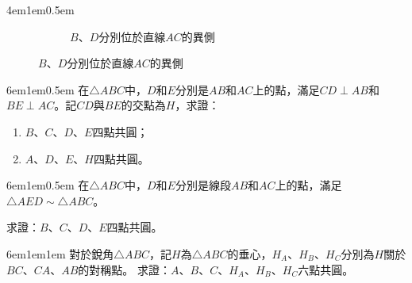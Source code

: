 \documentclass[12pt]{article}
\begin{document}
\begin{mybox}[定理]{4em}{1em}{0.5em}
\begin{figure}[H]
\begin{subfigure}[b]{0.45\textwidth}
            \centering
            \caption{$B$、$D$分別位於直線$AC$的異側}
            \label{fig:concyclic_s2.1-2}
        \end{subfigure}
    \end{figure}
\end{mybox}
\begin{mybox}[例題\thesubsection-1]{6em}{1em}{0.5em}
    在$\triangle{ABC}$中，$D$和$E$分別是$AB$和$AC$上的點，滿足$CD\perp AB$和$BE\perp AC$。記$CD$與$BE$的交點為$H$，求證：
    \begin{enumerate}[label = (\roman*.), itemsep=0.3em]
        \item $B$、$C$、$D$、$E$四點共圓；
        \item $A$、$D$、$E$、$H$四點共圓。
    \end{enumerate}
\end{mybox}
\begin{mybox}[例題\thesubsection-2]{6em}{1em}{0.5em}
    在$\triangle{ABC}$中，$D$和$E$分別是線段$AB$和$AC$上的點，滿足$\triangle{AED}\sim\triangle{ABC}$。

    求證：$B$、$C$、$D$、$E$四點共圓。
\end{mybox}
\begin{mybox}[例題\thesubsection-3]{6em}{1em}{1em}
    對於銳角$\triangle{ABC}$，記$H$為$\triangle{ABC}$的垂心，$H_A$、$H_B$、$H_C$分別為$H$關於$BC$、$CA$、$AB$的對稱點。
    求證：$A$、$B$、$C$、$H_A$、$H_B$、$H_C$六點共圓。
\end{mybox}
\iffalse
\end{document}
